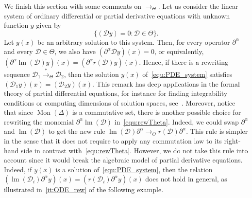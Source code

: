 \documentclass[11pt]{article}
\theoremstyle{definition}
\newcommand\D{\mathcal{D}}
\DeclareMathOperator{\lm}{lm}
\newcommand\monBasis{\Mon(\Delta)}
\DeclareMathOperator{\Mon}{Mon}
\newcommand\rewTheta{\to_\Theta}
\newcommand\transTheta{\overset{*}{\to}_\Theta}
\begin{document}
We finish this section with some comments on $\rewTheta$. Let us consider 
the linear system of ordinary differential or partial derivative
equations with unknown function $y$ given by 
\begin{equation}\label{equ:PDE_system}
  \{(\D y)=0:\D\in\Theta\}.
\end{equation}
Let $y(x)$ be an arbitrary solution to this system. Then, for every
operator $\partial^\alpha$ and every $\D\in\Theta$, we also have
$(\partial^\alpha\D y)(x)=0$, or equivalently,
$(\partial^\alpha\lm(\D)y)(x)=(\partial^\alpha r(\D)y)(x)$. Hence, if
there is a rewriting sequence $\D_1\transTheta\D_2$, then the solution
$y(x)$ of~\eqref{equ:PDE_system} satisfies $(\D_1y)(x)=(\D_2y)(x)$. This
remark has deep applications in the formal theory of partial differential
equations, for instance for finding integrability conditions or computing
dimensions of solution spaces, see~\cite{MR1308976}. Moreover, notice
that since $\monBasis$ is a commutative set, there is another possible
choice for rewriting the monomial $\partial^\alpha\lm(\D)$
in~\eqref{equ:rewTheta}. Indeed, we could swap $\partial^\alpha$ and
$\lm(\D)$ to get the new rule
$\lm(\D)\partial^\alpha\rewTheta r(\D)\partial^\alpha$. This rule is
simpler in the sense that it does not require to apply any commutation 
law to its right-hand side in contrast with~\eqref{equ:rewTheta}.
However, we do not take this rule into account since it would break the
algebraic model of partial derivative equations. Indeed, if $y(x)$ is a
solution of~\eqref{equ:PDE_system}, then the relation
$(\lm(\D_i)\partial^\alpha y)(x)=(r(\D_i)\partial^\alpha y)(x)$ does not
hold in general, as illustrated in~\ref{it:ODE_rew} of the following
example.
\smallskip
\end{document}
